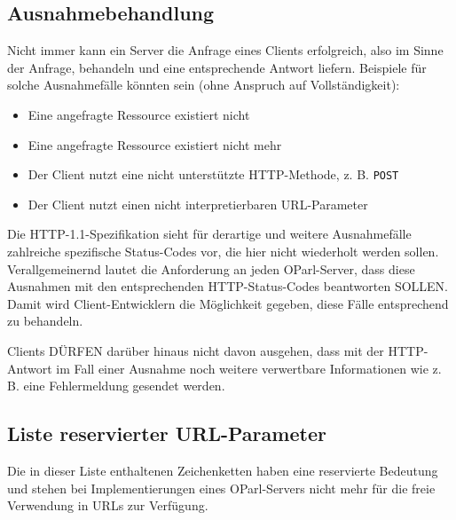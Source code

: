 \documentclass[,a4paper]{article}
\begin{document}
\subsection{Ausnahmebehandlung}\label{ausnahmebehandlung}

Nicht immer kann ein Server die Anfrage eines Clients erfolgreich, also
im Sinne der Anfrage, behandeln und eine entsprechende Antwort liefern.
Beispiele für solche Ausnahmefälle könnten sein (ohne Anspruch auf
Vollständigkeit):

\begin{itemize}
\item
  Eine angefragte Ressource existiert nicht
\item
  Eine angefragte Ressource existiert nicht mehr
\item
  Der Client nutzt eine nicht unterstützte HTTP-Methode, z. B.
  \texttt{POST}
\item
  Der Client nutzt einen nicht interpretierbaren URL-Parameter
\end{itemize}

Die HTTP-1.1-Spezifikation sieht für derartige und weitere Ausnahmefälle
zahlreiche spezifische Status-Codes vor, die hier nicht wiederholt
werden sollen. Verallgemeinernd lautet die Anforderung an jeden
OParl-Server, dass diese Ausnahmen mit den entsprechenden
HTTP-Status-Codes beantworten SOLLEN. Damit wird Client-Entwicklern die
Möglichkeit gegeben, diese Fälle entsprechend zu behandeln.

Clients DÜRFEN darüber hinaus nicht davon ausgehen, dass mit der
HTTP-Antwort im Fall einer Ausnahme noch weitere verwertbare
Informationen wie z. B. eine Fehlermeldung gesendet werden.

\subsection{Liste reservierter
URL-Parameter}\label{liste-reservierter-url-parameter}

Die in dieser Liste enthaltenen Zeichenketten haben eine reservierte
Bedeutung und stehen bei Implementierungen eines OParl-Servers nicht
mehr für die freie Verwendung in URLs zur Verfügung.
\end{document}
